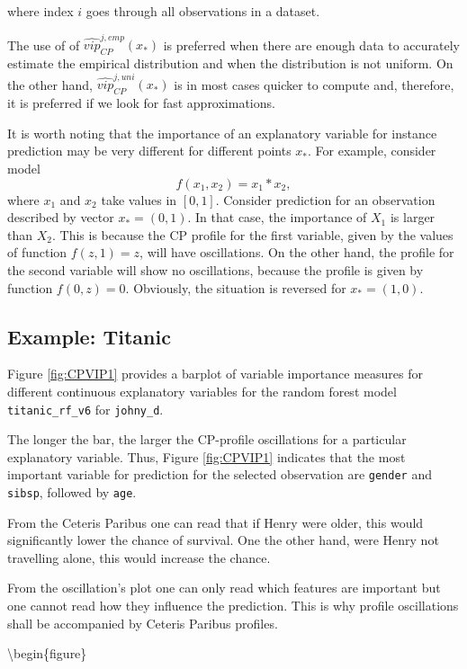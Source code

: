 \documentclass[12pt,]{krantz}
\begin{document}
where index \(i\) goes through all observations in a dataset.

The use of of \(\widehat{vip}_{CP}^{j,emp}(x_*)\) is preferred when there are enough data to accurately estimate the empirical distribution and when the distribution is not uniform. On the other hand, \(\widehat{vip}_{CP}^{j,uni}(x_*)\) is in most cases quicker to compute and, therefore, it is preferred if we look for fast approximations.

It is worth noting that the importance of an explanatory variable for instance prediction may be very different for different points \(x_*\). For example, consider model
\[
f(x_1, x_2) = x_1 * x_2,
\]
where \(x_1\) and \(x_2\) take values in \([0,1]\). Consider prediction for an observation described by vector \(x_* = (0,1)\). In that case, the importance of \(X_1\) is larger than \(X_2\). This is because the CP profile for the first variable, given by the values of function \(f(z,1)=z\), will have oscillations. On the other hand, the profile for the second variable will show no oscillations, because the profile is given by function \(f(0,z)=0\). Obviously, the situation is reversed for \(x_*=(1,0)\).

\hypertarget{CPOscExample}{%
\subsection{Example: Titanic}\label{CPOscExample}}

Figure \ref{fig:CPVIP1} provides a barplot of variable importance measures for different continuous explanatory variables for the random forest model \texttt{titanic\_rf\_v6} for \texttt{johny\_d}.

The longer the bar, the larger the CP-profile oscillations for a particular explanatory variable. Thus, Figure \ref{fig:CPVIP1} indicates that the most important variable for prediction for the selected observation are \texttt{gender} and \texttt{sibsp}, followed by \texttt{age}.

From the Ceteris Paribus one can read that if Henry were older, this would significantly lower the chance of survival. One the other hand, were Henry not travelling alone, this would increase the chance.

From the oscillation's plot one can only read which features are important but one cannot read how they influence the prediction. This is why profile oscillations shall be accompanied by Ceteris Paribus profiles.

\textbackslash{}begin\{figure\}
\end{document}

